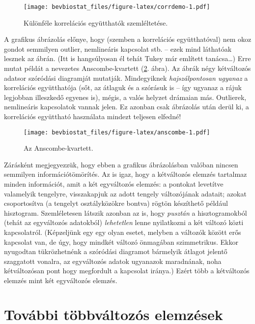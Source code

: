 \documentclass[]{book}
\begin{document}
\begin{figure}
\centering
\texttt{[image: bevbiostat\_files/figure-latex/corrdemo-1.pdf]}
\caption{\label{fig:corrdemo}Különféle korrelációs együtthatók
szemléltetése.}
\end{figure}

A grafikus ábrázolás előnye, hogy (szemben a korrelációs együtthatóval)
nem okoz gondot semmilyen outlier, nemlineáris kapcsolat stb. -- ezek
mind láthatóak lesznek az ábrán. (Itt is hangsúlyosan él tehát Tukey már
említett tanácsa\dots{}) Erre mutat példát a nevezetes Anscombe-kvartett
(\ref{fig:anscombe}. ábra). Az ábrák négy kétváltozós adatsor szóródási
diagramját mutatják. Mindegyiknek \emph{hajszálpontosan ugyanaz} a
korrelációs együtthatója (sőt, az átlaguk és a szórásuk is -- így
ugyanaz a rájuk legjobban illeszkedő egyenes is), mégis, a valós helyzet
drámaian más. Outlierek, nemlineáris kapcsolatok vannak jelen. Ez
azonban csak ábrázolás után derül ki, a korrelációs együttható
használata mindezt teljesen elfedné!

\begin{figure}
\centering
\texttt{[image: bevbiostat\_files/figure-latex/anscombe-1.pdf]}
\caption{\label{fig:anscombe}Az Anscombe-kvartett.}
\end{figure}

Zárásként megjegyezzük, hogy ebben a grafikus ábrázolásban valóban
nincsen semmilyen információtömörítés. Az is igaz, hogy a kétváltozós
elemzés tartalmaz minden információt, amit a két egyváltozós elemzés: a
pontokat levetítve valamelyik tengelyre, visszakapjuk az adott tengely
változójának adatait; azokat csoportosítva (a tengelyt osztályközökre
bontva) rögtön készíthető például hisztogram. Szemléletesen látszik
azonban az is, hogy \emph{pusztán} a hisztogramokból (tehát az
egyváltozós adatokból) \emph{lehetetlen} lenne nyilatkozni a két változó
közti kapcsolatról. (Képzeljünk egy egy olyan esetet, melyben a változók
között erős kapcsolat van, de úgy, hogy mindkét változó önmagában
szimmetrikus. Ekkor nyugodtan tükrözhetnénk a szóródási diagramot
bármelyik átlagot jelentő szaggatott vonalra, az egyváltozós adatok
ugyanazok maradnának, noha kétváltozósan pont hogy megfordult a
kapcsolat iránya.) Ezért több a kétváltozós elemzés mint két egyváltozós
elemzés.

\section{További többváltozós
elemzések}\label{deskriptivtovabbitobbvalt}
\end{document}
